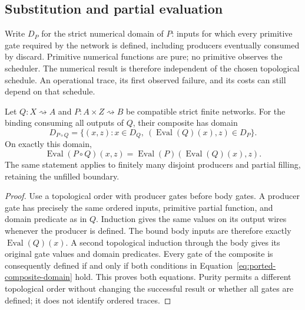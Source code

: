 \subsection{Substitution and partial evaluation}

Write $D_P$ for the strict numerical domain of $P$: inputs for which every
primitive gate required by the network is defined, including producers
eventually consumed by discard.  Primitive numerical functions are pure; no
primitive observes the scheduler.  The numerical result is therefore
independent of the chosen topological schedule.  An operational trace, its
first observed failure, and its costs can still depend on that schedule.

\begin{theorem}
\label{thm:ported-substitution-evaluation}
Let $Q:X\rightsquigarrow A$ and $P:A\times Z\rightsquigarrow B$ be
compatible strict finite networks.  For the binding consuming all outputs of
$Q$, their composite has domain
\begin{equation}
  D_{P\circ Q}
  =\{(x,z):x\in D_Q,\ (\operatorname{Eval}(Q)(x),z)\in D_P\}.
  \label{eq:ported-composite-domain}
\end{equation}
On exactly this domain,
\begin{equation}
  \operatorname{Eval}(P\circ Q)(x,z)
  =\operatorname{Eval}(P)(\operatorname{Eval}(Q)(x),z).
  \label{eq:ported-composite-evaluation}
\end{equation}
The same statement applies to finitely many disjoint producers and partial
filling, retaining the unfilled boundary.
\end{theorem}
\begin{proof}
Use a topological order with producer gates before body gates.  A producer gate
has precisely the same ordered inputs, primitive partial function, and domain
predicate as in $Q$.  Induction gives the same values on its output wires
whenever the producer is defined.  The bound body inputs are therefore exactly
$\operatorname{Eval}(Q)(x)$.  A second topological induction through the body
gives its original gate values and domain predicates.  Every gate of the
composite is consequently defined if and only if both conditions in
Equation~\eqref{eq:ported-composite-domain} hold.  This proves both equations.
Purity permits a different topological order without changing the successful
result or whether all gates are defined; it does not identify ordered traces.
\end{proof}

